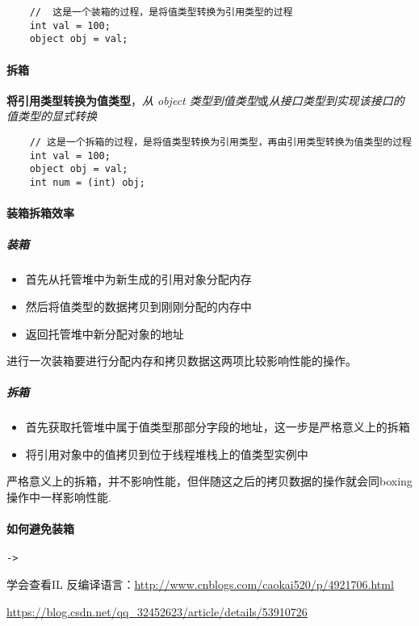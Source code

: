 \documentclass[UTF8,a4paper,12pt]{ctexbook}
\begin{document}
				\begin{lstlisting}
	// 	这是一个装箱的过程，是将值类型转换为引用类型的过程
	int val = 100; 
	object obj = val; 
				\end{lstlisting}
				
			\paragraph{拆箱}
				\textbf{将引用类型转换为值类型}，\textit{从 object 类型到值类型}或\textit{从接口类型到实现该接口的值类型的显式转换}
				
				\begin{lstlisting}
	// 这是一个拆箱的过程，是将值类型转换为引用类型，再由引用类型转换为值类型的过程
	int val = 100; 
	object obj = val; 
	int num = (int) obj; 
				\end{lstlisting}
				
			\paragraph{装箱拆箱效率}
				\subparagraph{装箱}
					\begin{itemize}[itemindent = 1em]
						\item 首先从托管堆中为新生成的引用对象分配内存
						\item 然后将值类型的数据拷贝到刚刚分配的内存中
						\item 返回托管堆中新分配对象的地址
					\end{itemize}
					进行一次装箱要进行分配内存和拷贝数据这两项比较影响性能的操作。
					
				\subparagraph{拆箱}
					\begin{itemize}[itemindent = 1em]
						\item 首先获取托管堆中属于值类型那部分字段的地址，这一步是严格意义上的拆箱
						\item 将引用对象中的值拷贝到位于线程堆栈上的值类型实例中
					\end{itemize}
					严格意义上的拆箱，并不影响性能，但伴随这之后的拷贝数据的操作就会同boxing操作中一样影响性能.
					
			\paragraph{如何避免装箱}\verb|->|
			
				学会查看IL 反编译语言：\url{http://www.cnblogs.com/caokai520/p/4921706.html}
				
				\url{https://blog.csdn.net/qq_32452623/article/details/53910726}
				
\end{document}
